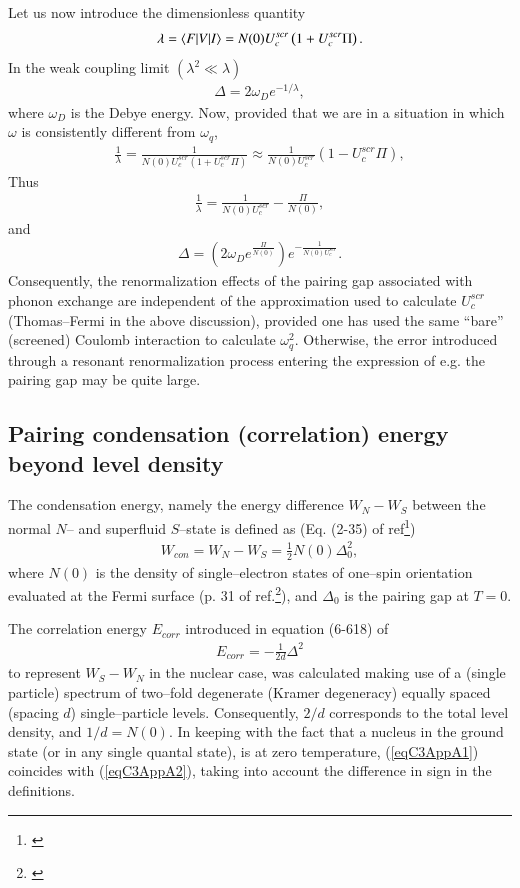 \begin{subappendices}
Let us now introduce the dimensionless quantity
\begin{align}\label{eqC2AppA25}
\lambda=\langle {F|V|I} \rangle=N(0)U^{scr}_c\left(1+U^{scr}_c\Pi\right).
\end{align}
In the weak coupling limit $(\lambda^2\ll\lambda)$
\begin{align}\label{eqC2AppA26}
\Delta=2\omega_De^{-1/\lambda},
\end{align}
where $\omega_D$ is the Debye energy.
Now, provided that we are in a situation in which $\omega$ is consistently different from $\omega_q$,
\begin{align}\label{eqC2AppA28}
\frac{1}{\lambda}=\frac{1}{N(0)U^{scr}_c\left(1+U^{scr}_c\Pi\right)}\approx\frac{1}{N(0)U^{scr}_c}\left(1-U^{scr}_c\Pi\right),
\end{align}
Thus
\begin{align}\label{eqC2AppA29}
\frac{1}{\lambda}=\frac{1}{N(0)U^{scr}_c}-\frac{\Pi}{N(0)},
\end{align}
and
\begin{align}\label{eqC2AppA30}
\Delta=\left(2\omega_De^{\frac{\Pi}{N(0)}}\right)e^{-\frac{1}{N(0)U^{scr}_c}}.
\end{align}
Consequently, the renormalization effects of the pairing gap associated with phonon exchange are independent of the approximation used to calculate $U^{scr}_c$ (Thomas--Fermi in the above discussion), provided one has used the same ``bare'' (screened) Coulomb interaction to calculate $\omega^2_q$.   Otherwise, the error introduced through a resonant renormalization process entering the expression of e.g. the pairing gap may be quite large.
\subsection{Pairing condensation (correlation) energy beyond level density}



The condensation energy, namely the energy difference $W_N-W_S$ between the normal $N$-- and superfluid $S$--state is defined as (Eq. (2-35) of ref\footnote{\cite{Schrieffer:64}})
\begin{align}\label{eqC3AppA1}
W_{con}=W_N-W_S=\frac{1}{2}N(0)\Delta_0^2,
\end{align}
where $N(0)$ is the density of single--electron states of one--spin orientation evaluated at the Fermi surface (p. 31 of ref.\footnote{\label{foot}\cite{Bohr:75}}), and $\Delta_0$ is the pairing gap at $T=0$.


The correlation energy $E_{corr}$ introduced in equation (6-618) of \footnotemark[\ref{foot}]
\begin{align}\label{eqC3AppA2}
E_{corr}=-\frac{1}{2d}\Delta^2
\end{align}
to represent $W_S-W_N$ in the nuclear case, was calculated making use of a (single particle) spectrum of two--fold degenerate (Kramer degeneracy) equally spaced (spacing $d$) single--particle levels. Consequently, $2/d$ corresponds to the total level density, and $1/d=N(0)$. In keeping with the fact that a nucleus in the ground state (or in any single quantal state), is at zero temperature, (\ref{eqC3AppA1})  coincides with (\ref{eqC3AppA2}), taking into account the difference in sign in the definitions.

\end{subappendices}
